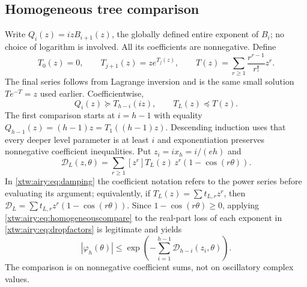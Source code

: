 \documentclass[11pt]{article}
\theoremstyle{remark}\newtheorem{remark}[theorem]{Remark}
\begin{document}
\subsection{Homogeneous tree comparison}
Write $Q_i(z)=izB_{i+1}(z)$, the globally defined entire exponent of $B_i$;
no choice of logarithm is involved. All its coefficients are nonnegative.
Define
\begin{equation}\label{xtw:airy:eq:homogeneous}
 T_0(z)=0,\qquad T_{j+1}(z)=ze^{T_j(z)},\qquad
 T(z)=\sum_{r\ge1}\frac{r^{r-1}}{r!}z^r.
\end{equation}
The final series follows from Lagrange inversion and is the same small
solution $Te^{-T}=z$ used earlier. Coefficientwise,
\begin{equation}\label{xtw:airy:eq:homogeneouscompare}
 Q_i(z)\succeq T_{h-i}(iz),\qquad T_L(z)\preceq T(z).
\end{equation}
The first comparison starts at $i=h-1$ with equality
$Q_{h-1}(z)=(h-1)z=T_1((h-1)z)$. Descending induction uses that every deeper
level parameter is at least $i$ and exponentiation preserves nonnegative
coefficient inequalities.
Put $z_i=ix_h=i/(eh)$ and
\begin{equation}\label{xtw:airy:eq:damping}
 \mathcal D_L(z,\theta)
 =\sum_{r\ge1}[z^r]T_L(z)\,z^r(1-\cos(r\theta)).
\end{equation}
In \eqref{xtw:airy:eq:damping} the coefficient notation refers to the power series
before evaluating its argument; equivalently, if $T_L(z)=\sum t_{L,r}z^r$,
then $\mathcal D_L=\sum t_{L,r}z^r(1-\cos(r\theta))$.
Since $1-\cos(r\theta)\ge0$, applying \eqref{xtw:airy:eq:homogeneouscompare} to the
real-part loss of each exponent in \eqref{xtw:airy:eq:dropfactors} is legitimate and yields
\begin{equation}\label{xtw:airy:eq:sumdamping}
 |\varphi_h(\theta)|\le
 \exp\!\left(-\sum_{i=1}^{h-1}\mathcal D_{h-i}(z_i,\theta)\right).
\end{equation}
The comparison is on nonnegative coefficient sums, not on oscillatory
complex values.
\end{document}
